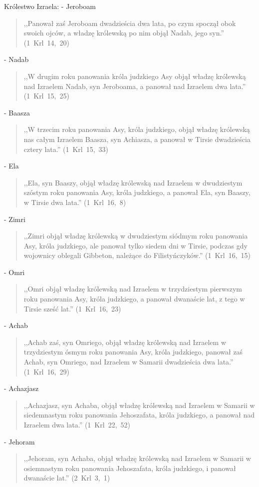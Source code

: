 \documentclass[10pt,a4paper,oneside]{article}
\begin{document}
Królestwo Izraela:
- Jeroboam
\begin{quote}
,,Panował zaś Jeroboam dwadzieścia dwa lata, po czym spoczął obok swoich ojców, a władzę królewską po nim objął Nadab, jego syn.'' (1~Krl~14,~20)
\end{quote}
- Nadab
\begin{quote}
,,W drugim roku panowania króla judzkiego Asy objął władzę królewską nad Izraelem Nadab, syn Jeroboama, a panował nad Izraelem dwa lata.'' (1~Krl~15,~25)
\end{quote}
- Baasza
\begin{quote}
,,W trzecim roku panowania Asy, króla judzkiego, objął władzę królewską nas całym Izraelem Baasza, syn Achiasza, a panował w Tirsie dwadzieścia cztery lata.'' (1~Krl~15,~33)
\end{quote}
- Ela
\begin{quote}
,,Ela, syn Baaszy, objął władzę królewską nad Izraelem w dwudziestym szóstym roku panowania Asy, króla judzkiego, a panował Ela, syn Baaszy, w Tirsie dwa lata.'' (1~Krl~16,~8)
\end{quote}
- Zimri
\begin{quote}
,,Zimri objął władzę królewską w dwudziestym siódmym roku panowania Asy, króla judzkiego, ale panował tylko siedem dni w Tirsie, podczas gdy wojownicy oblegali Gibbeton, należące do Filistyńczyków.'' (1~Krl~16,~15)
\end{quote}
- Omri
\begin{quote}
,,Omri objął władzę królewską nad Izraelem w trzydziestym pierwszym roku panowania Asy, króla judzkiego, a panował dwanaście lat, z tego w Tirsie sześć lat.'' (1~Krl~16,~23)
\end{quote}
- Achab
\begin{quote}
,,Achab zaś, syn Omriego, objął władzę królewską nad Izraelem w trzydziestym ósmym roku panowania Asy, króla judzkiego, panował zaś Achab, syn Omriego, nad Izraelem w Samarii dwadzieścia dwa lata.'' (1~Krl~16,~29)
\end{quote}
- Achazjasz
\begin{quote}
,,Achazjasz, syn Achaba, objął władzę królewską nad Izraelem w Samarii w siedemnastym roku panowania Jehoszafata, króla judzkiego, a panował nad Izraelem dwa lata.'' (1~Krl~22,~52)
\end{quote}
- Jehoram
\begin{quote}
,,Jehoram, syn Achaba, objął władzę królewską nad Izraelem w Samarii w osiemnastym roku panowania Jehoszafata, króla judzkiego, i panował dwanaście lat.'' (2~Krl~3,~1)
\end{quote}
\end{document}
